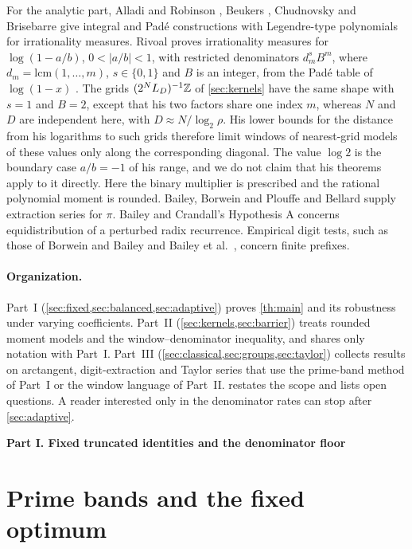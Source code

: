 \documentclass[11pt]{article}
\newcommand{\partmark}[1]{\bigskip\par\begin{center}{\large\bfseries #1}\end{center}\nopagebreak\smallskip}
\begin{document}
For the analytic part, Alladi and Robinson \cite{alladi}, Beukers \cite{beukers}, Chudnovsky \cite{chud} and Brisebarre \cite{bris} give integral and Pad\'e constructions with Legendre-type polynomials for irrationality measures. Rivoal \cite{rivoal} proves irrationality measures for $\log(1-a/b)$, $0<|a/b|<1$, with restricted denominators $d_m^sB^m$, where $d_m=\mathrm{lcm}(1,\dots,m)$, $s\in\{0,1\}$ and $B$ is an integer, from the Pad\'e table of $\log(1-x)$ \cite[Theorems~1--4, pp.~934--937]{rivoal}. The grids $(2^NL_D)^{-1}\mathbb Z$ of \cref{sec:kernels} have the same shape with $s=1$ and $B=2$, except that his two factors share one index $m$, whereas $N$ and $D$ are independent here, with $D\approx N/\log_2\rho$. His lower bounds for the distance from his logarithms to such grids therefore limit windows of nearest-grid models of these values only along the corresponding diagonal. The value $\log 2$ is the boundary case $a/b=-1$ of his range, and we do not claim that his theorems apply to it directly. Here the binary multiplier is prescribed and the rational polynomial moment is rounded. Bailey, Borwein and Plouffe \cite{bbp} and Bellard \cite{bellard} supply extraction series for $\pi$. Bailey and Crandall's Hypothesis A \cite{bc01} concerns equidistribution of a perturbed radix recurrence. Empirical digit tests, such as those of Borwein and Bailey \cite{experiment} and Bailey et al.\ \cite{empirical}, concern finite prefixes.

\paragraph{Organization.} Part~I (\cref{sec:fixed,sec:balanced,sec:adaptive}) proves \cref{th:main} and its robustness under varying coefficients. Part~II (\cref{sec:kernels,sec:barrier}) treats rounded moment models and the window--denominator inequality, and shares only notation with Part~I. Part~III (\cref{sec:classical,sec:groups,sec:taylor}) collects results on arctangent, digit-extraction and Taylor series that use the prime-band method of Part~I or the window language of Part~II.  restates the scope and lists open questions. A reader interested only in the denominator rates can stop after \cref{sec:adaptive}.

\partmark{Part I. Fixed truncated identities and the denominator floor}

\section{Prime bands and the fixed optimum}\label{sec:fixed}
\end{document}
